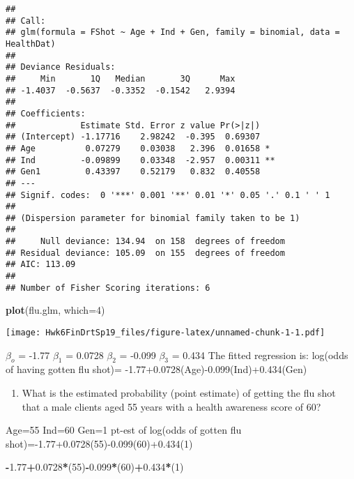 \documentclass[]{article}
\newenvironment{Shaded}{\begin{snugshade}}{\end{snugshade}}
\newcommand{\KeywordTok}[1]{\textcolor[rgb]{0.13,0.29,0.53}{\textbf{#1}}}
\newcommand{\DataTypeTok}[1]{\textcolor[rgb]{0.13,0.29,0.53}{#1}}
\newcommand{\DecValTok}[1]{\textcolor[rgb]{0.00,0.00,0.81}{#1}}
\newcommand{\FloatTok}[1]{\textcolor[rgb]{0.00,0.00,0.81}{#1}}
\newcommand{\OperatorTok}[1]{\textcolor[rgb]{0.81,0.36,0.00}{\textbf{#1}}}
\newcommand{\NormalTok}[1]{#1}
\providecommand{\tightlist}{%
  \setlength{\itemsep}{0pt}\setlength{\parskip}{0pt}}
\begin{document}
\begin{verbatim}
## 
## Call:
## glm(formula = FShot ~ Age + Ind + Gen, family = binomial, data = HealthDat)
## 
## Deviance Residuals: 
##     Min       1Q   Median       3Q      Max  
## -1.4037  -0.5637  -0.3352  -0.1542   2.9394  
## 
## Coefficients:
##             Estimate Std. Error z value Pr(>|z|)   
## (Intercept) -1.17716    2.98242  -0.395  0.69307   
## Age          0.07279    0.03038   2.396  0.01658 * 
## Ind         -0.09899    0.03348  -2.957  0.00311 **
## Gen1         0.43397    0.52179   0.832  0.40558   
## ---
## Signif. codes:  0 '***' 0.001 '**' 0.01 '*' 0.05 '.' 0.1 ' ' 1
## 
## (Dispersion parameter for binomial family taken to be 1)
## 
##     Null deviance: 134.94  on 158  degrees of freedom
## Residual deviance: 105.09  on 155  degrees of freedom
## AIC: 113.09
## 
## Number of Fisher Scoring iterations: 6
\end{verbatim}

\begin{Shaded}
\begin{Highlighting}[]
\KeywordTok{plot}\NormalTok{(flu.glm, }\DataTypeTok{which=}\DecValTok{4}\NormalTok{)}
\end{Highlighting}
\end{Shaded}

\texttt{[image: Hwk6FinDrtSp19\_files/figure-latex/unnamed-chunk-1-1.pdf]}

\(\beta_o\) = -1.77 \(\beta_1\) = 0.0728 \(\beta_2\) = -0.099
\(\beta_3\) = 0.434 The fitted regression is: log(odds of having gotten
flu shot)= -1.77+0.0728(Age)-0.099(Ind)+0.434(Gen)

\begin{enumerate}
\def\labelenumi{\Alph{enumi})}
\setcounter{enumi}{1}
\tightlist
\item
  What is the estimated probability (point estimate) of getting the flu
  shot that a male clients aged 55 years with a health awareness score
  of 60?
\end{enumerate}

Age=55 Ind=60 Gen=1 pt-est of log(odds of gotten flu
shot)=-1.77+0.0728(55)-0.099(60)+0.434(1)

\begin{Shaded}
\begin{Highlighting}[]
\OperatorTok{-}\FloatTok{1.77}\OperatorTok{+}\FloatTok{0.0728}\OperatorTok{*}\NormalTok{(}\DecValTok{55}\NormalTok{)}\OperatorTok{-}\FloatTok{0.099}\OperatorTok{*}\NormalTok{(}\DecValTok{60}\NormalTok{)}\OperatorTok{+}\FloatTok{0.434}\OperatorTok{*}\NormalTok{(}\DecValTok{1}\NormalTok{)}
\end{Highlighting}
\end{Shaded}
\end{document}
